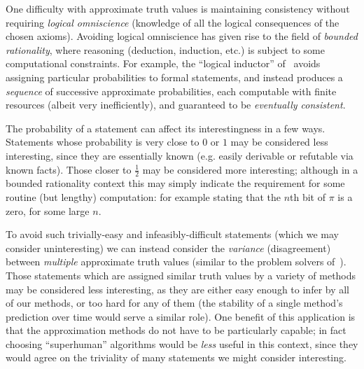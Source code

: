 One difficulty with approximate truth values is maintaining consistency without
requiring \emph{logical omniscience} (knowledge of all the logical consequences
of the chosen axioms). Avoiding logical omniscience has given rise to the field
of \emph{bounded rationality}, where reasoning (deduction, induction, etc.) is
subject to some computational constraints. For example, the ``logical inductor''
of~\cite{garrabrant2016logical} avoids assigning particular probabilities to
formal statements, and instead produces a \emph{sequence} of successive
approximate probabilities, each computable with finite resources (albeit very
inefficiently), and guaranteed to be \emph{eventually consistent}.

The probability of a statement can affect its interestingness in a few ways.
Statements whose probability is very close to $0$ or $1$ may be considered
less interesting, since they are essentially known (e.g. easily derivable or
refutable via known facts). Those closer to $\frac{1}{2}$ may be considered more
interesting; although in a bounded rationality context this may simply indicate
the requirement for some routine (but lengthy) computation: for example stating
that the $n$th bit of $\pi$ is a zero, for some large $n$.

To avoid such trivially-easy and infeasibly-difficult statements (which we may
consider uninteresting) we can instead consider the \emph{variance}
(disagreement) between \emph{multiple} approximate truth values (similar to the
problem solvers of~\cite{fernando2013design1, fernando2013design2}). Those
statements which are assigned similar truth values by a variety of methods may
be considered less interesting, as they are either easy enough to infer by all
of our methods, or too hard for any of them (the stability of a single method's
prediction over time would serve a similar role). One benefit of this
application is that the approximation methods do not have to be particularly
capable; in fact choosing ``superhuman'' algorithms would be \emph{less} useful
in this context, since they would agree on the triviality of many statements we
might consider interesting.

\iffalse
\subsection{Interestingness in Concept Formation}
\label{sec:conceptformation}

\cite{Montano-Rivas.McCasland.Dixon.ea:2012}
\cite{Piantadosi.Tenenbaum.Goodman:2012}
\cite{Wille:2005}
\cite{colton1999automatic}
\cite{colton2000agent}
\cite{colton2012automated}
\cite{lenat1977automated}
\cite{mullerunderstanding}
\cite{Bundy.Cavallo.Dixon.ea:2015}
\cite{johansson2009isacosy}
\cite{spector2008genetic}
\cite{colton2012automated}
\cite{geng2006interestingness}



\fi
